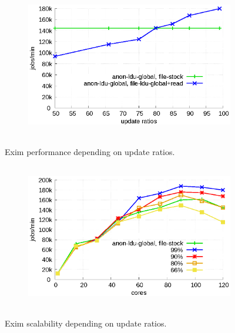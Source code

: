 \begin{figure}[t!]
    \centering
    \begin{subfigure}[b]{1\textwidth}
  \begin{center}
        \includegraphics[height=2.5in]{graph/ratio_exim.eps}
  \end{center}
    \end{subfigure}%
    \caption{Exim performance depending on update ratios.}
    \label{fig:UpdateRate_exim}
\end{figure}

\begin{figure}[t!]
    \centering
    \begin{subfigure}[b]{1\textwidth}
        \includegraphics[height=2.5in]{graph/ratio_exim_core.eps}
    \end{subfigure}%
    \caption{Exim scalability depending on update ratios.}
    \label{fig:UpdateRate_exim_2}
\end{figure}

